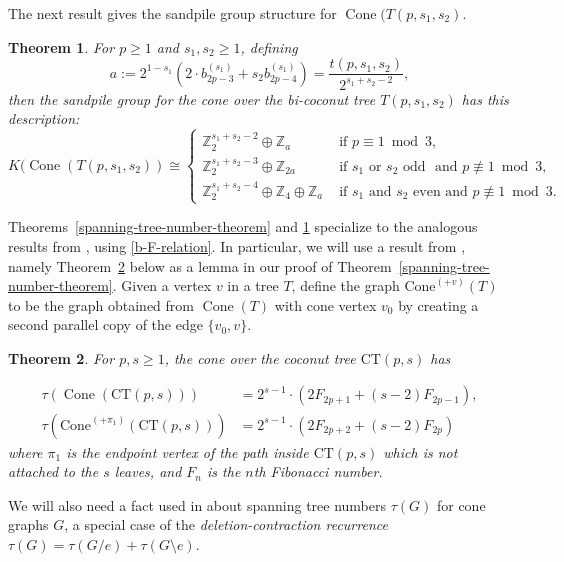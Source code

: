 \documentclass[10pt,reqno]{amsart}
\newcommand{\Z}{\mathbb{Z}}
\DeclareMathOperator{\Cone}{Cone}
\newcommand{\CT}[2]{\mathrm{CT}(#1,#2)}
\newcommand{\Coneplus}[1]{\mathrm{Cone}^{(+#1)}}
\newtheorem{theorem}{Theorem}[section]
\begin{document}
The next result gives the sandpile group structure
for $\Cone(T(p,s_1,s_2)$.

\begin{theorem}
\label{sandpile-group-theorem}
For $p \geq 1$ and $s_1,s_2 \geq 1$, defining
\begin{equation}
\label{formula-for-a}
    a:=2^{1-s_1}(2\cdot b_{2p-3}^{(s_1)} +s_2b_{2p-4}^{(s_1)})
    =\frac{t(p,s_1,s_2)}{2^{s_1+s_2-2}},
\end{equation}
then the sandpile group for the cone over the
bi-coconut tree $T(p,s_1,s_2)$ has this description:
$$
K(\Cone(T(p,s_1,s_2)) \cong
\begin{cases}
    \Z_2^{s_1+s_2-2} \oplus \Z_a 
    & \text{ if } p \equiv 1 \bmod{3},\\
    \Z_2^{s_1+s_2-3} \oplus \Z_{2a}   
    & \text{ if }s_1   \text{ or } s_2 \text{ odd } \text{ and }p \not\equiv 1 \bmod{3},\\
    \Z_2^{s_1+s_2-4} \oplus \Z_4\oplus\Z_{a}  
    & \text{ if }s_1 \text{ and } s_2  \text{ even  and }p \not\equiv 1 \bmod{3}.
\end{cases}
$$
\end{theorem}
\noindent
Theorems~\ref{spanning-tree-number-theorem}
and \ref{sandpile-group-theorem} specialize
to the analogous results from \cite{Reiner2024SandpileGF},
using \eqref{b-F-relation}. In particular, we will use
a result from \cite{Reiner2024SandpileGF}, namely
Theorem~\ref{old-theorem_in_RS} below as a lemma in our proof of
Theorem~\ref{spanning-tree-number-theorem}.
Given a vertex $v$ in a tree $T$, define the graph $\Coneplus{v}(T)$ to be the graph obtained from $\Cone(T)$ with cone vertex $v_0$ by creating a second parallel copy of the edge $\{v_0,v\}$.

\begin{theorem}  
\label{old-theorem_in_RS}
\cite{Reiner2024SandpileGF}
For $p,s \geq 1$, the cone over the coconut tree $\CT ps$
has 

\begin{align}
\tau (\Cone( \CT ps)) &= 2^{s-1} \cdot (2{F}_{2p+1} + (s-2){F}_{2p-1}),\label{eq:1}\\
\tau (\Coneplus{\pi_1}(\CT ps)) &= 2^{s-1} \cdot (2{F}_{2p+2} + (s-2){F}_{2p})\label{eq:2} 
\end{align}
where $\pi_1$ is the endpoint vertex of the path
inside $\CT ps$
which is {\it not} attached to the $s$ leaves, and $F_n$ is the $n$th Fibonacci number.
\end{theorem}


\noindent
We will also need a fact used in \cite{Reiner2024SandpileGF}
about spanning tree numbers $\tau(G)$ for cone graphs $G$, a special case of the {\it deletion-contraction recurrence} $\tau(G)=\tau(G/e)+\tau(G\setminus e)$.
\end{document}
